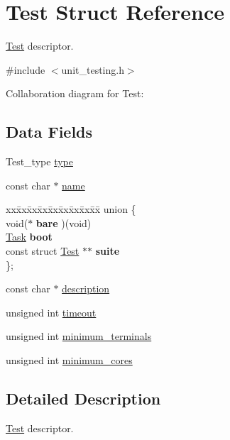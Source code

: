 \hypertarget{structTest}{}\section{Test Struct Reference}
\label{structTest}


\hyperlink{structTest}{Test} descriptor.  




{\ttfamily \#include $<$unit\+\_\+testing.\+h$>$}



Collaboration diagram for Test\+:
\subsection*{Data Fields}
\begin{DoxyCompactItemize}
\item 
Test\+\_\+type \hyperlink{structTest_a5074007b777ea0958966027197c17792}{type}
\item 
const char $\ast$ \hyperlink{structTest_ae44674e48b203d9c26e04e09b6fe5b61}{name}
\item 
\begin{tabbing}
xx\=xx\=xx\=xx\=xx\=xx\=xx\=xx\=xx\=\kill
union \{\\
\>void($\ast$ {\bfseries bare} )(void)\\
\>\hyperlink{group__syscalls_gaec3f2f835e105271fbbc00272c0ba984}{Task} {\bfseries boot}\\
\>const struct \hyperlink{structTest}{Test} $\ast$$\ast$ {\bfseries suite}\\
\}; \\

\end{tabbing}\item 
const char $\ast$ \hyperlink{structTest_a294ca3f1114240c908f66216afcad783}{description}
\item 
unsigned int \hyperlink{structTest_a80e78f2e6aeed2a6e5b7c705ce5a1493}{timeout}
\item 
unsigned int \hyperlink{structTest_a2741188633c51b8e3cb545fa3971bf60}{minimum\+\_\+terminals}
\item 
unsigned int \hyperlink{structTest_ac203918837b4c6718a020246e189a95a}{minimum\+\_\+cores}
\end{DoxyCompactItemize}


\subsection{Detailed Description}
\hyperlink{structTest}{Test} descriptor. 

